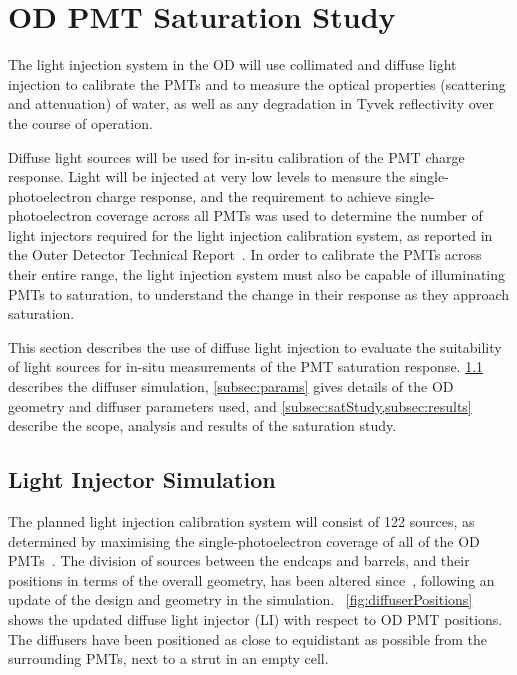 \documentclass[a4paper,11pt]{article}
\begin{document}
\section{OD PMT Saturation Study}\label{sec:saturation}

The light injection system in the OD will use collimated and diffuse light injection to calibrate the PMTs and to measure the optical properties (scattering and attenuation) of water, as well as any degradation in Tyvek reflectivity over the course of operation. 

Diffuse light sources will be used for in-situ calibration of the PMT charge response. Light will be injected at very low levels to measure the single-photoelectron charge response, and the requirement to achieve single-photoelectron coverage across all PMTs was used to determine the number of light injectors required for the light injection calibration system, as reported in the Outer Detector Technical Report~\cite{TN64}. In order to calibrate the PMTs across their entire range, the light injection system must also be capable of illuminating PMTs to saturation, to understand the change in their response as they approach saturation. 

This section describes the use of diffuse light injection to evaluate the suitability of light sources for in-situ measurements of the PMT saturation response. \cref{subsec:LIsim} describes the diffuser simulation, \cref{subsec:params} gives details of the OD geometry and diffuser parameters used, and \cref{subsec:satStudy,subsec:results} describe the scope, analysis and results of the saturation study.

\subsection{Light Injector Simulation}\label{subsec:LIsim}

The planned light injection calibration system will consist of 122 sources, as determined by maximising the single-photoelectron coverage of all of the OD PMTs~\cite{TN64}. The division of sources between the endcaps and barrels, and their positions in terms of the overall geometry, has been altered since~\cite{TN64}, following an update of the design and geometry in the simulation. ~\cref{fig:diffuserPositions} shows the updated diffuse light injector (LI) with respect to OD PMT positions. The diffusers have been positioned as close to equidistant as possible from the surrounding PMTs, next to a strut in an empty cell. 
\end{document}
